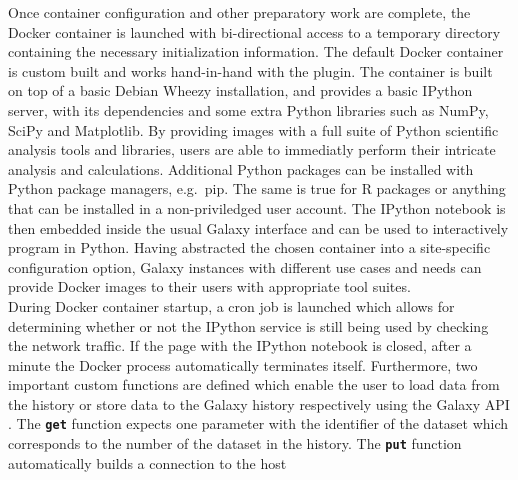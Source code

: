 \documentclass{bioinfo}
\begin{document}
\begin{methods}
Once container configuration and other preparatory work are complete, the Docker container is launched with bi-directional
access to a temporary directory containing the necessary initialization information. The default Docker container is
custom built and works hand-in-hand with the plugin. The container is built on top of a basic Debian Wheezy installation,
and provides a basic IPython server, with its dependencies and some extra Python libraries such as NumPy, SciPy and Matplotlib.
By providing images with a full suite of Python scientific analysis tools and libraries, users are able 
to immediatly perform their intricate analysis and calculations. Additional Python packages can be installed with Python
package managers, e.g.\ pip. The same is true for R packages or anything that can be installed in a non-priviledged user account. 
The IPython notebook is then embedded inside the usual Galaxy interface and can be used to interactively program in Python.
Having abstracted the chosen container into a site-specific configuration option, Galaxy instances with different use cases
and needs can provide Docker images to their users with appropriate tool suites.\\
During Docker container startup, a cron job is launched which allows for determining whether or not the IPython service
is still being used by checking the network traffic. If the page with the IPython notebook is closed, after a minute the
Docker process automatically terminates itself. Furthermore, two important custom functions are defined which enable the
user to load data from the history or store data to the Galaxy history respectively using the Galaxy API \citep{Sloggett2013}.
The \textbf{\texttt{get}} function expects one parameter with the identifier of the dataset which corresponds to the number
of the dataset in the history. The \textbf{\texttt{put}} function automatically builds a connection to the host

\end{methods}
\end{document}
